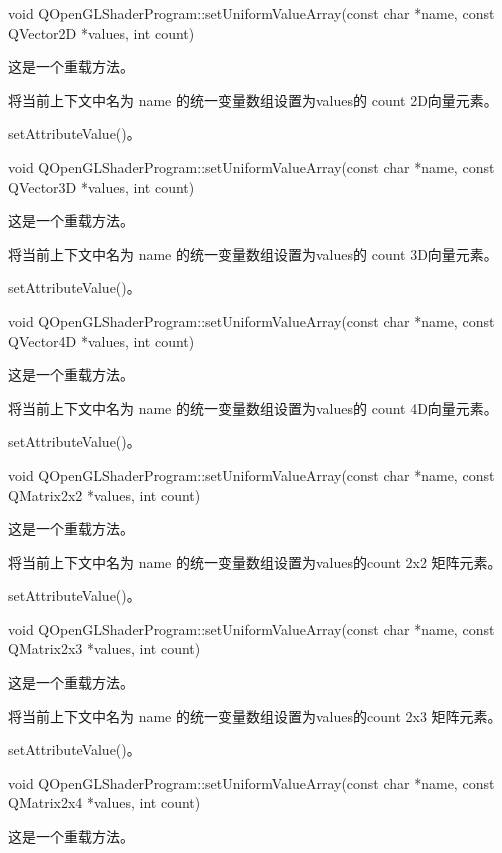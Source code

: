 void QOpenGLShaderProgram::setUniformValueArray(const char *name, const QVector2D *values, int count)

这是一个重载方法。

将当前上下文中名为 name 的统一变量数组设置为values的 count 2D向量元素。


\begin{seeAlso}
setAttributeValue()。
\end{seeAlso}

void QOpenGLShaderProgram::setUniformValueArray(const char *name, const QVector3D *values, int count)

这是一个重载方法。

将当前上下文中名为 name 的统一变量数组设置为values的 count 3D向量元素。

\begin{seeAlso}
setAttributeValue()。
\end{seeAlso}

void QOpenGLShaderProgram::setUniformValueArray(const char *name, const QVector4D *values, int count)

这是一个重载方法。

将当前上下文中名为 name 的统一变量数组设置为values的 count 4D向量元素。

\begin{seeAlso}
setAttributeValue()。
\end{seeAlso}

void QOpenGLShaderProgram::setUniformValueArray(const char *name, const QMatrix2x2 *values, int count)

这是一个重载方法。

将当前上下文中名为 name 的统一变量数组设置为values的count 2x2 矩阵元素。

\begin{seeAlso}
setAttributeValue()。
\end{seeAlso}

void QOpenGLShaderProgram::setUniformValueArray(const char *name, const QMatrix2x3 *values, int count)

这是一个重载方法。

将当前上下文中名为 name 的统一变量数组设置为values的count 2x3 矩阵元素。

\begin{seeAlso}
setAttributeValue()。
\end{seeAlso}

void QOpenGLShaderProgram::setUniformValueArray(const char *name, const QMatrix2x4 *values, int count)

这是一个重载方法。

